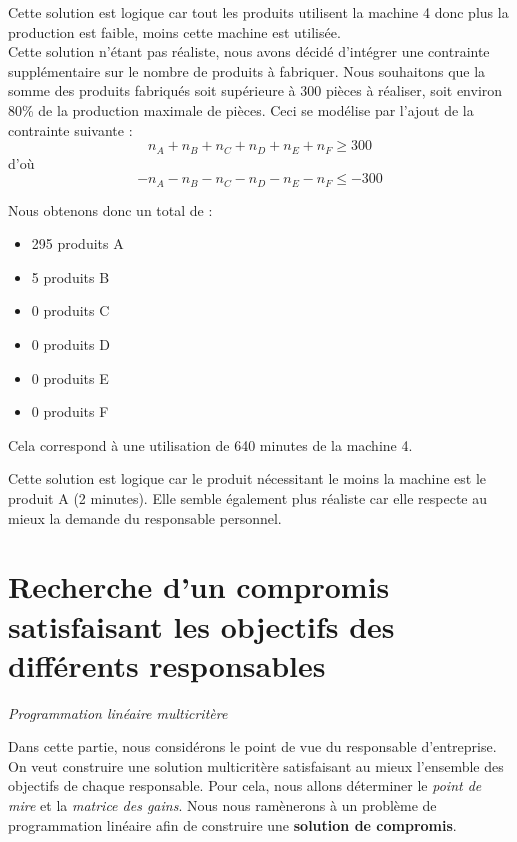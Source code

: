 \documentclass[a4paper,10pt]{article}
\begin{document}
Cette solution est logique car tout les produits utilisent la machine 4 donc plus la production est faible, moins cette machine est utilisée.\\

Cette solution n'étant pas réaliste, nous avons décidé d'intégrer une contrainte supplémentaire sur le nombre de produits à fabriquer. Nous souhaitons que la somme des produits fabriqués soit supérieure à 300 pièces à réaliser, soit environ 80\% de la production maximale de pièces.
Ceci se modélise par l'ajout de la contrainte suivante :\\

$$n_A + n_B + n_C + n_D + n_E + n_F \geq 300$$
d'où $$-n_A -n_B -n_C -n_D -n_E -n_F \leq -300$$

Nous obtenons donc un total de :\newline
\begin{itemize}
\item[\textbullet] 295 produits A
\item[\textbullet] 5 produits B
\item[\textbullet] 0 produits C
\item[\textbullet] 0 produits D
\item[\textbullet] 0 produits E
\item[\textbullet] 0 produits F\newline
\end{itemize}
Cela correspond à une utilisation de 640 minutes de la machine 4.\newline

Cette solution est logique car le produit nécessitant le moins la machine est le produit A (2 minutes). Elle semble également plus réaliste car elle respecte au mieux la demande du responsable personnel.



\newpage
\part{Recherche d'un compromis satisfaisant les objectifs des différents responsables}
\begin{large}
\emph{Programmation linéaire multicritère}
\end{large}

Dans cette partie, nous considérons le point de vue du responsable d'entreprise. On veut construire une solution multicritère satisfaisant au mieux l'ensemble des objectifs de chaque responsable. Pour cela, nous allons déterminer le \emph{point de mire} et la \emph{matrice des gains}. Nous nous ramènerons à un problème de programmation linéaire afin de construire une \textbf{solution de compromis}.
\end{document}

